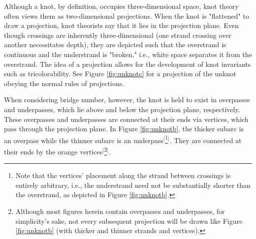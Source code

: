 \documentclass[titlepage]{article}
\begin{document}
\noindent Although a knot, by definition, occupies three-dimensional space, knot theory often views them as two-dimensional projections. When the knot is "flattened" to draw a projection, knot theorists say that it lies in the projection plane. Even though crossings are inherently three-dimensional (one strand crossing over another necessitates depth), they are depicted such that the overstrand is continuous and the understrand is "broken," i.e., white space separates it from the overstrand. The idea of a projection allows for the development of knot invariants such as tricolorability. See Figure \ref{fig:unknotc} for a projection of the unknot obeying the normal rules of projections.\par
When considering bridge number, however, the knot is held to exist in overpasses and underpasses, which lie above and below the projection plane, respectively. These overpasses and underpasses are connected at their ends via vertices, which pass through the projection plane. In Figure \ref{fig:unknotb}, the thicker subarc is an overpass while the thinner subarc is an underpass$^[$\footnote{Note that the vertices' placement along the strand between crossings is entirely arbitrary, i.e., the understrand need not be substantially shorter than the overstrand, as depicted in Figure \ref{fig:unknotb}.}$^]$. They are connected at their ends by the orange vertices$^[$\footnote{Although most figures herein contain overpasses and underpasses, for simplicity's sake, not every subsequent projection will be drawn like Figure \ref{fig:unknotb} (with thicker and thinner strands and vertices).}$^]$.\par
\end{document}
